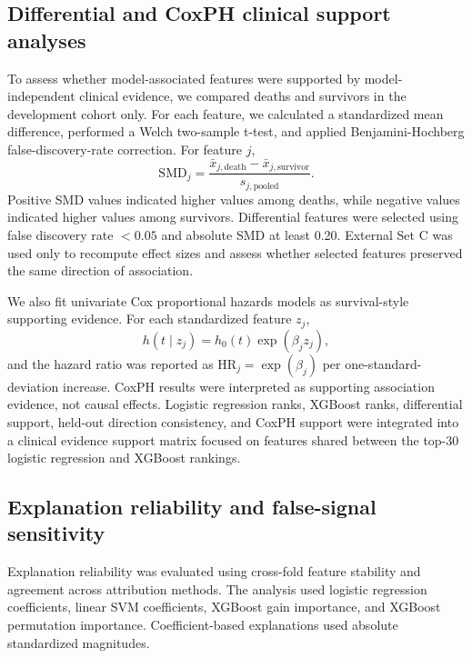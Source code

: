 \documentclass[10pt,twocolumn,letterpaper]{article}
\begin{document}
\subsection{Differential and CoxPH clinical support analyses}

To assess whether model-associated features were supported by model-independent clinical evidence, we compared deaths and survivors in the development cohort only. For each feature, we calculated a standardized mean difference, performed a Welch two-sample t-test, and applied Benjamini-Hochberg false-discovery-rate correction. For feature $j$,
\begin{equation}
\mathrm{SMD}_j
=
\frac{
\bar{x}_{j,\mathrm{death}}-\bar{x}_{j,\mathrm{survivor}}
}{
s_{j,\mathrm{pooled}}
}.
\end{equation}
Positive SMD values indicated higher values among deaths, while negative values indicated higher values among survivors. Differential features were selected using false discovery rate $<0.05$ and absolute SMD at least 0.20. External Set C was used only to recompute effect sizes and assess whether selected features preserved the same direction of association.

We also fit univariate Cox proportional hazards models as survival-style supporting evidence. For each standardized feature $z_j$,
\begin{equation}
h(t \mid z_j)=h_0(t)\exp(\beta_j z_j),
\end{equation}
and the hazard ratio was reported as $\mathrm{HR}_j=\exp(\beta_j)$ per one-standard-deviation increase. CoxPH results were interpreted as supporting association evidence, not causal effects. Logistic regression ranks, XGBoost ranks, differential support, held-out direction consistency, and CoxPH support were integrated into a clinical evidence support matrix focused on features shared between the top-30 logistic regression and XGBoost rankings.

\subsection{Explanation reliability and false-signal sensitivity}

Explanation reliability was evaluated using cross-fold feature stability and agreement across attribution methods. The analysis used logistic regression coefficients, linear SVM coefficients, XGBoost gain importance, and XGBoost permutation importance. Coefficient-based explanations used absolute standardized magnitudes.
\end{document}
